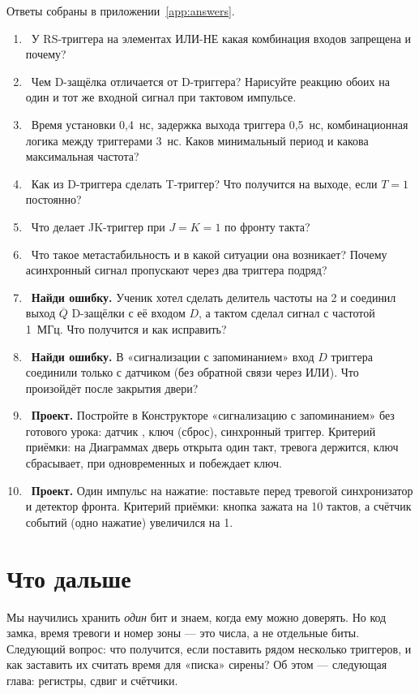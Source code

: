 Ответы собраны в приложении~\ref{app:answers}.

\begin{taskbox}
\begin{enumerate}
  \item {}~У RS-триггера на элементах ИЛИ-НЕ какая комбинация входов запрещена и почему?
  \item {}~Чем D-защёлка отличается от D-триггера? Нарисуйте реакцию обоих на один и тот же входной сигнал при тактовом импульсе.
  \item {}~Время установки 0,4~нс, задержка выхода триггера 0,5~нс, комбинационная логика между триггерами 3~нс. Каков минимальный период и какова максимальная частота?
  \item {}~Как из D-триггера сделать T-триггер? Что получится на выходе, если $T=1$ постоянно?
  \item {}~Что делает JK-триггер при $J=K=1$ по фронту такта?
  \item {}~Что такое метастабильность и в какой ситуации она возникает? Почему асинхронный сигнал пропускают через два триггера подряд?
  \item {}~\textbf{Найди ошибку.} Ученик хотел сделать делитель частоты на 2 и соединил выход $\overline{Q}$ D-защёлки с её входом $D$, а тактом сделал сигнал с частотой 1~МГц. Что получится и как исправить?
  \item {}~\textbf{Найди ошибку.} В «сигнализации с запоминанием» вход $D$ триггера соединили только с датчиком (без обратной связи через ИЛИ). Что произойдёт после закрытия двери?
  \item {}~\textbf{Проект.} Постройте в Конструкторе «сигнализацию с запоминанием» без готового урока: датчик , ключ  (сброс), синхронный триггер. Критерий приёмки: на Диаграммах дверь открыта один такт, тревога держится, ключ сбрасывает, при одновременных  и  побеждает ключ.
  \item {}~\textbf{Проект.} Один импульс на нажатие: поставьте перед тревогой синхронизатор и детектор фронта. Критерий приёмки: кнопка зажата на 10 тактов, а счётчик событий (одно нажатие) увеличился на 1.
\end{enumerate}
\end{taskbox}

\section{Что дальше}

Мы научились хранить \emph{один} бит и знаем, когда ему можно доверять. Но
код замка, время тревоги и номер зоны --- это числа, а не отдельные биты.
Следующий вопрос: что получится, если поставить рядом несколько триггеров, и
как заставить их считать время для «писка» сирены? Об этом --- следующая
глава: регистры, сдвиг и счётчики.

